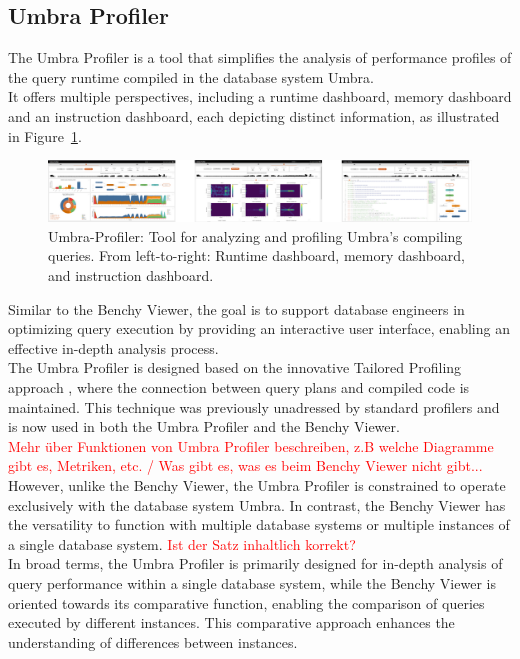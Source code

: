 \subsection{Umbra Profiler}
The Umbra Profiler is a tool that simplifies the analysis of performance profiles of the query runtime compiled in the database system Umbra.
\\ It offers multiple perspectives, including a runtime dashboard, memory dashboard and an instruction dashboard, each depicting distinct information, as illustrated in Figure~\ref{fig:umbra-profiler}.
\begin{figure}[h]
    \centering
    \includegraphics[width=1\linewidth]{figures/umbra-profiler.png}
    \caption{Umbra-Profiler: Tool for analyzing and profiling Umbra’s compiling queries. From left-to-right: Runtime dashboard, memory dashboard, and instruction dashboard.}
    \label{fig:umbra-profiler}
  \end{figure}

\noindent Similar to the Benchy Viewer, the goal is to support database engineers in optimizing query execution by providing an interactive user interface, enabling an effective in-depth analysis process. 
\\The Umbra Profiler is designed based on the innovative Tailored Profiling approach \cite{profiling-dataflow}, where the connection between query plans and compiled code is maintained. This technique was previously unadressed by standard profilers and is now used in both the Umbra Profiler and the Benchy Viewer.  
\\ \textcolor{red}{Mehr über Funktionen von Umbra Profiler beschreiben, z.B welche Diagramme gibt es, Metriken, etc. / Was gibt es, was es beim Benchy Viewer nicht gibt...}
\\However, unlike the Benchy Viewer, the Umbra Profiler is constrained to operate exclusively with the database system Umbra. In contrast, the Benchy Viewer has the versatility to function with multiple database systems or multiple instances of a single database system.  \textcolor{red}{Ist der Satz inhaltlich korrekt?}
\\In broad terms, the Umbra Profiler is primarily designed for in-depth analysis of query performance within a single database system, while the Benchy Viewer is oriented towards its comparative function, enabling the comparison of queries executed by different instances. This comparative approach enhances the understanding of differences between instances.




